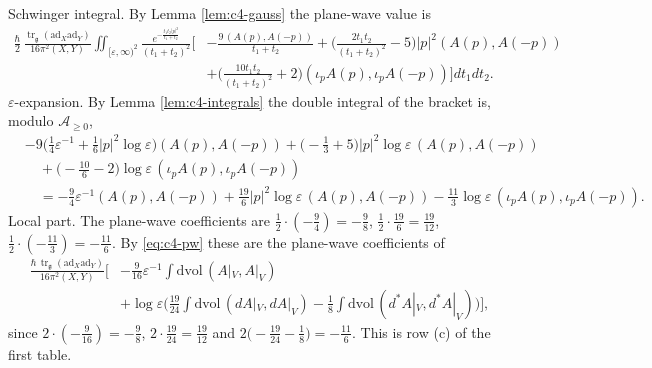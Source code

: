 \begin{example}
Schwinger integral. By Lemma \ref{lem:c4-gauss} the plane-wave value is
\[
\begin{aligned}
\frac\hbar2\,\frac{\operatorname{tr}_{\mathfrak g}(\mathrm{ad}_X\mathrm{ad}_Y)}{16\pi^2(X,Y)}\iint_{[\varepsilon,\infty)^2}\frac{e^{-\frac{t_1t_2|p|^2}{t_1+t_2}}}{(t_1+t_2)^2}\Big[&-\frac{9\,(A(p),A(-p))}{t_1+t_2}+\Big(\frac{2t_1t_2}{(t_1+t_2)^2}-5\Big)|p|^2(A(p),A(-p))\\
&+\Big(\frac{10t_1t_2}{(t_1+t_2)^2}+2\Big)(\iota_pA(p),\iota_pA(-p))\Big]dt_1dt_2 .
\end{aligned}
\]
$\varepsilon$-expansion. By Lemma \ref{lem:c4-integrals} the double integral of the bracket is, modulo $\mathscr A_{\ge0}$,
\[
\begin{aligned}
&-9\Big(\tfrac14\varepsilon^{-1}+\tfrac16|p|^2\log\varepsilon\Big)(A(p),A(-p))+\Big(-\tfrac13+5\Big)|p|^2\log\varepsilon\,(A(p),A(-p))\\
&\quad+\Big(-\tfrac{10}6-2\Big)\log\varepsilon\,(\iota_pA(p),\iota_pA(-p))\\
&\quad=-\tfrac94\varepsilon^{-1}(A(p),A(-p))+\tfrac{19}{6}|p|^2\log\varepsilon\,(A(p),A(-p))-\tfrac{11}{3}\log\varepsilon\,(\iota_pA(p),\iota_pA(-p)).
\end{aligned}
\]
Local part. The plane-wave coefficients are $\tfrac12\cdot(-\tfrac94)=-\tfrac98$, $\tfrac12\cdot\tfrac{19}6=\tfrac{19}{12}$, $\tfrac12\cdot(-\tfrac{11}3)=-\tfrac{11}6$. By \eqref{eq:c4-pw} these are the plane-wave coefficients of
\[
\begin{aligned}
\frac{\hbar\,\operatorname{tr}_{\mathfrak g}(\mathrm{ad}_X\mathrm{ad}_Y)}{16\pi^2(X,Y)}\Big[&-\tfrac9{16}\varepsilon^{-1}\int\mathrm{dvol}\,(A|_V,A|_V)\\
&+\log\varepsilon\Big(\tfrac{19}{24}\int\mathrm{dvol}\,(dA|_V,dA|_V)-\tfrac18\int\mathrm{dvol}\,(d^*A|_V,d^*A|_V)\Big)\Big],
\end{aligned}
\]
since $2\cdot(-\tfrac9{16})=-\tfrac98$, $2\cdot\tfrac{19}{24}=\tfrac{19}{12}$ and $2\big(-\tfrac{19}{24}-\tfrac18\big)=-\tfrac{11}{6}$. This is row (c) of the first table.
\end{example}

